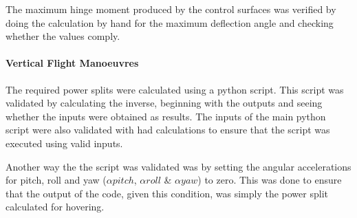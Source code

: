 The maximum hinge moment produced by the control surfaces was verified by doing the calculation by hand for the maximum deflection angle and checking whether the values comply.

\paragraph{Vertical Flight Manoeuvres}
The required power splits were calculated using a python script. This script was validated by calculating the inverse, beginning with the outputs and seeing whether the inputs were obtained as results. The inputs of the main python script were also validated with had calculations to ensure that the script was executed using valid inputs. 

Another way the the script was validated was by setting the angular accelerations for pitch, roll and yaw ($\alpha{pitch}$, $\alpha{roll}$ \& $\alpha{yaw}$) to zero. This was done to ensure that the output of the code, given this condition, was simply the power split calculated for hovering.


